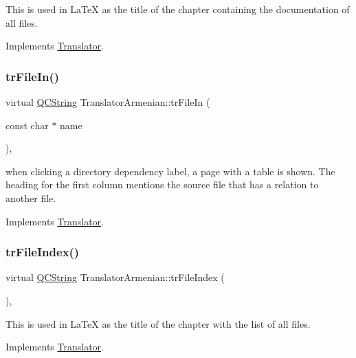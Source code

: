 This is used in La\+TeX as the title of the chapter containing the documentation of all files. 

Implements \mbox{\hyperlink{class_translator}{Translator}}.

\mbox{\label{class_translator_armenian_af5d985e19a1226edad471f71af530275}} 
\subsubsection{\texorpdfstring{trFileIn()}{trFileIn()}}
{\footnotesize\ttfamily virtual \mbox{\hyperlink{class_q_c_string}{Q\+C\+String}} Translator\+Armenian\+::tr\+File\+In (\begin{DoxyParamCaption}\item[{const char $\ast$}]{name }\end{DoxyParamCaption})\hspace{0.3cm}{\ttfamily [inline]}, {\ttfamily [virtual]}}

when clicking a directory dependency label, a page with a table is shown. The heading for the first column mentions the source file that has a relation to another file. 

Implements \mbox{\hyperlink{class_translator}{Translator}}.

\mbox{\label{class_translator_armenian_a05e3dfe8763632d622ed6cd779ba21ba}} 
\subsubsection{\texorpdfstring{trFileIndex()}{trFileIndex()}}
{\footnotesize\ttfamily virtual \mbox{\hyperlink{class_q_c_string}{Q\+C\+String}} Translator\+Armenian\+::tr\+File\+Index (\begin{DoxyParamCaption}{ }\end{DoxyParamCaption})\hspace{0.3cm}{\ttfamily [inline]}, {\ttfamily [virtual]}}

This is used in La\+TeX as the title of the chapter with the list of all files. 

Implements \mbox{\hyperlink{class_translator}{Translator}}.

